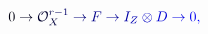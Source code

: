 \documentclass[12pt]{article}
\begin{document}
\makeatletter
\renewcommand*{\@textcolor}[3]{%
  \protect\leavevmode
  \begingroup
    \color#1{#2}#3%
  \endgroup
}
\makeatother
\begin{displaymath}
\mathcolor[RGB]{0,0,15}{0} \mathcolor[RGB]{0,0,30}{\to} \mathcal { \mathcolor[RGB]{0,0,45}{O} } _ { \mathcolor[RGB]{0,0,60}{X} } ^ { \mathcolor[RGB]{0,0,75}{r} \mathcolor[RGB]{0,0,90}{-} \mathcolor[RGB]{0,0,105}{1} } \mathcolor[RGB]{0,0,120}{\to} \mathcolor[RGB]{0,0,135}{F} \mathcolor[RGB]{0,0,150}{\to} \mathcolor[RGB]{0,0,165}{I} _ { \mathcolor[RGB]{0,0,180}{Z} } \mathcolor[RGB]{0,0,195}{\otimes} \mathcolor[RGB]{0,0,210}{D} \mathcolor[RGB]{0,0,225}{\to} \mathcolor[RGB]{0,0,240}{0} \mathcolor[RGB]{0,0,255}{,}
\end{displaymath}
\end{document}
